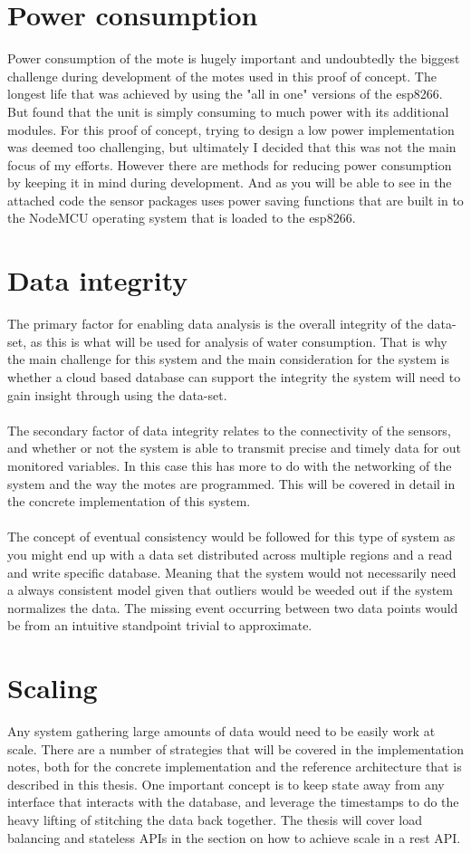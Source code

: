 \documentclass[]{uiophd}
\begin{document}
\section{Power consumption}
Power consumption of the mote is hugely important and undoubtedly the biggest challenge during development of the motes used in this proof of concept. The longest life that was achieved by using the "all in one" versions of the esp8266. But found that the unit is simply consuming to much power with its additional modules. For this proof of concept, trying to design a low power implementation was deemed too challenging, but ultimately I decided that this was not the main focus of my efforts. However there are methods for reducing power consumption by keeping it in mind during development. And as you will be able to see in the attached code the sensor packages uses power saving functions that are built in to the NodeMCU operating system that is loaded to the esp8266.
\section{Data integrity}
The primary factor for enabling data analysis is the overall integrity of the data-set, as this is what will be used for analysis of water consumption. That is why the main challenge for this system and the main consideration for the system is whether a cloud based database can support the integrity the system will need to gain insight through using the data-set. 
\\\\
The secondary factor of data integrity relates to the connectivity of the sensors, and whether or not the system is able to transmit precise and timely data for out monitored variables. In this case this has  more to do with the networking of the system and the way the motes are programmed. This will be covered in detail in the concrete implementation of this system.
\\\\
The concept of eventual consistency would be followed for this type of system as you might end up with a data set distributed across multiple regions and a read and write specific database. Meaning that the system would not necessarily need a always consistent model given that outliers would be weeded out if the system normalizes the data. The missing event occurring between two data points would be from an intuitive standpoint trivial to approximate.
\section{Scaling}
Any system gathering large amounts of data would need to be easily work at scale. There are a number of strategies that will be covered in the implementation notes, both for the concrete implementation and the reference architecture that is described in this thesis. One important concept is to keep state away from any interface that interacts with the database, and leverage the timestamps to do the heavy lifting of stitching the data back together. The thesis will cover load balancing and stateless APIs in the section on how to achieve scale in a rest API.
\end{document}

